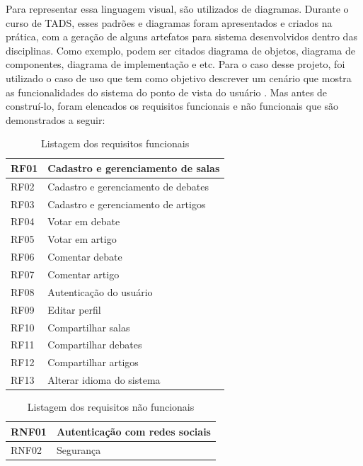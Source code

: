 Para representar essa linguagem visual, são utilizados de diagramas. Durante o curso de TADS, esses padrões e diagramas foram apresentados e criados na prática, com a geração de alguns artefatos para sistema desenvolvidos dentro das disciplinas. Como exemplo, podem ser citados diagrama de objetos, diagrama de componentes, diagrama de implementação e etc. Para o caso desse projeto, foi utilizado o caso de uso que tem como objetivo descrever um cenário que mostra as funcionalidades do sistema do ponto de vista do usuário . Mas antes de construí-lo, foram elencados os requisitos funcionais e não funcionais que são demonstrados a seguir:


\begin{table}[]
\centering
\caption{Listagem dos requisitos funcionais}
\label{my-label}
\begin{tabular}{|l|l|}
\hline
RF01 & Cadastro e gerenciamento de salas   \\ \hline
RF02 & Cadastro e gerenciamento de debates \\ \hline
RF03 & Cadastro e gerenciamento de artigos \\ \hline
RF04 & Votar em debate                     \\ \hline
RF05 & Votar em artigo                     \\ \hline
RF06 & Comentar debate                     \\ \hline
RF07 & Comentar artigo                     \\ \hline
RF08 & Autenticação do usuário             \\ \hline
RF09 & Editar perfil                       \\ \hline
RF10 & Compartilhar salas                  \\ \hline
RF11 & Compartilhar debates                \\ \hline
RF12 & Compartilhar artigos                \\ \hline
RF13 & Alterar idioma do sistema           \\ \hline
\end{tabular}
\end{table}

\begin{table}[]
\centering
\caption{Listagem dos requisitos não funcionais}
\label{my-label}
\begin{tabular}{|l|l|}
\hline
RNF01 & Autenticação com redes sociais \\ \hline
RNF02 & Segurança                      \\ \hline
\end{tabular}
\end{table}

